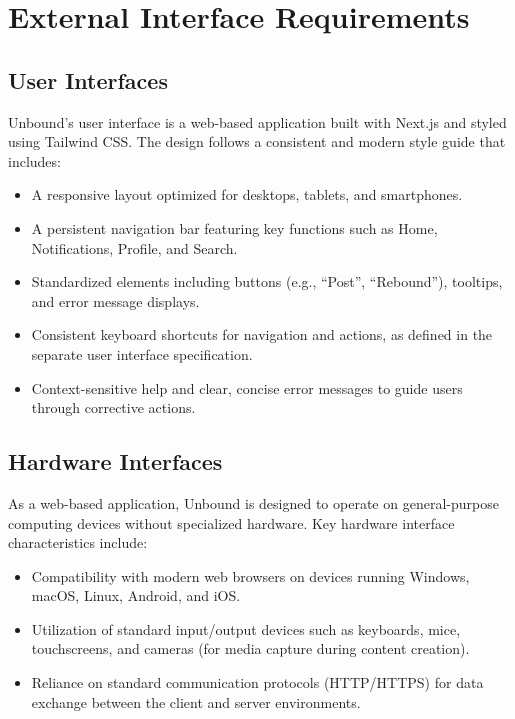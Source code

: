 \documentclass[a4paper,12pt]{article}
\begin{document}
\section{External Interface Requirements}

\subsection{User Interfaces}
Unbound’s user interface is a web-based application built with Next.js and styled using Tailwind CSS. The design follows a consistent and modern style guide that includes:
\begin{itemize}
    \item A responsive layout optimized for desktops, tablets, and smartphones.
    \item A persistent navigation bar featuring key functions such as Home, Notifications, Profile, and Search.
    \item Standardized elements including buttons (e.g., “Post”, “Rebound”), tooltips, and error message displays.
    \item Consistent keyboard shortcuts for navigation and actions, as defined in the separate user interface specification.
    \item Context-sensitive help and clear, concise error messages to guide users through corrective actions.
\end{itemize}

\subsection{Hardware Interfaces}
As a web-based application, Unbound is designed to operate on general-purpose computing devices without specialized hardware. Key hardware interface characteristics include:
\begin{itemize}
    \item Compatibility with modern web browsers on devices running Windows, macOS, Linux, Android, and iOS.
    \item Utilization of standard input/output devices such as keyboards, mice, touchscreens, and cameras (for media capture during content creation).
    \item Reliance on standard communication protocols (HTTP/HTTPS) for data exchange between the client and server environments.
\end{itemize}
\end{document}
